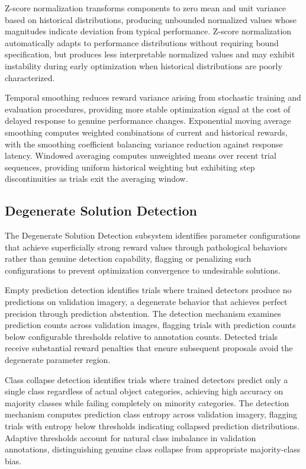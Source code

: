 Z-score normalization transforms components to zero mean and unit variance based on historical distributions, producing unbounded normalized values whose magnitudes indicate deviation from typical performance. Z-score normalization automatically adapts to performance distributions without requiring bound specification, but produces less interpretable normalized values and may exhibit instability during early optimization when historical distributions are poorly characterized.

Temporal smoothing reduces reward variance arising from stochastic training and evaluation procedures, providing more stable optimization signal at the cost of delayed response to genuine performance changes. Exponential moving average smoothing computes weighted combinations of current and historical rewards, with the smoothing coefficient balancing variance reduction against response latency. Windowed averaging computes unweighted means over recent trial sequences, providing uniform historical weighting but exhibiting step discontinuities as trials exit the averaging window.

\subsection{Degenerate Solution Detection}

The Degenerate Solution Detection subsystem identifies parameter configurations that achieve superficially strong reward values through pathological behaviors rather than genuine detection capability, flagging or penalizing such configurations to prevent optimization convergence to undesirable solutions.

Empty prediction detection identifies trials where trained detectors produce no predictions on validation imagery, a degenerate behavior that achieves perfect precision through prediction abstention. The detection mechanism examines prediction counts across validation images, flagging trials with prediction counts below configurable thresholds relative to annotation counts. Detected trials receive substantial reward penalties that ensure subsequent proposals avoid the degenerate parameter region.

Class collapse detection identifies trials where trained detectors predict only a single class regardless of actual object categories, achieving high accuracy on majority classes while failing completely on minority categories. The detection mechanism computes prediction class entropy across validation imagery, flagging trials with entropy below thresholds indicating collapsed prediction distributions. Adaptive thresholds account for natural class imbalance in validation annotations, distinguishing genuine class collapse from appropriate majority-class bias.

